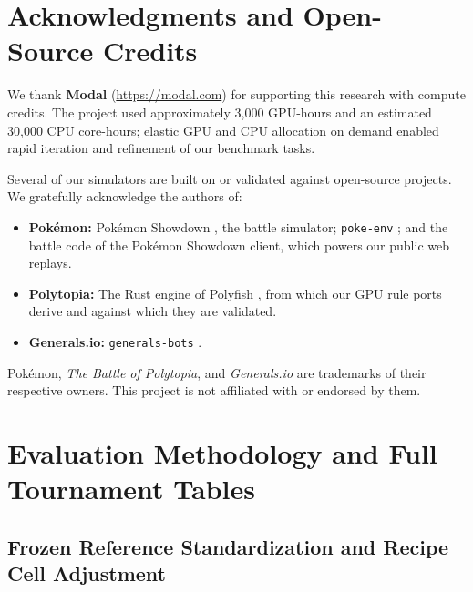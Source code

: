 \documentclass[11pt,letterpaper]{article}
\newcommand{\pokemon}{Pok\'emon}
\begin{document}
\section*{Acknowledgments and Open-Source Credits}

We thank \textbf{Modal} (\url{https://modal.com}) for supporting this research with compute credits. The project used approximately 3,000 GPU-hours and an estimated 30,000 CPU core-hours; elastic GPU and CPU allocation on demand enabled rapid iteration and refinement of our benchmark tasks.

Several of our simulators are built on or validated against open-source projects. We gratefully acknowledge the authors of:
\begin{itemize}
  \item \textbf{\pokemon{}:} \pokemon{} Showdown \citep[MIT;][]{showdown}, the battle simulator; \texttt{poke-env} \citep[MIT;][]{pokeenv}; and the battle code of the \pokemon{} Showdown client, which powers our public web replays.
  \item \textbf{Polytopia:} The Rust engine of Polyfish \citep[Apache-2.0;][]{polyfish}, from which our GPU rule ports derive and against which they are validated.
  \item \textbf{Generals.io:} \texttt{generals-bots} \citep[MIT;][]{generalsbots}.
\end{itemize}
\noindent
{\footnotesize\color{inkMuted} \pokemon{}, \textit{The Battle of Polytopia}, and \textit{Generals.io} are trademarks of their respective owners. This project is not affiliated with or endorsed by them.}

{\raggedright


}

\clearpage
\appendix

\section{Evaluation Methodology and Full Tournament Tables}
\label{app:methodology}

\subsection{Frozen Reference Standardization and Recipe Cell Adjustment}
\label{app:scoring}
\end{document}
